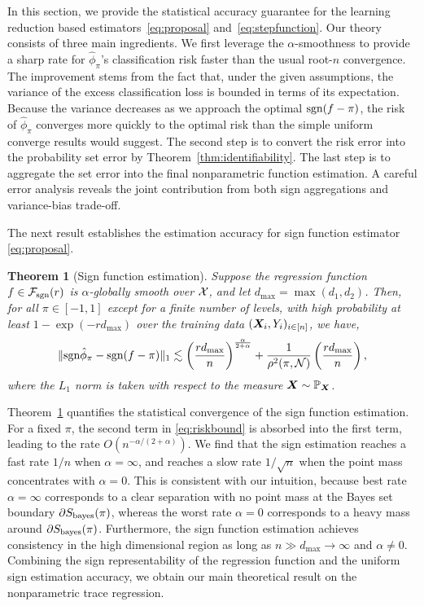 \documentclass[11pt]{article}
\theoremstyle{plain}
\newtheorem{thm}{Theorem}[section]
\theoremstyle{definition}
\def\caliF{\tF_{\textup{sgn}}}
\def\sign{\textup{sgn}}
\def\bayesS{S_{\textup{bayes}}}
\def\caliF{\tF_{\textup{sgn}}}
\begin{document}
In this section, we provide the statistical accuracy guarantee for the learning reduction based estimators~\eqref{eq:proposal} and~\eqref{eq:stepfunction}. Our theory consists of three main ingredients. We first leverage the $\alpha$-smoothness to provide a sharp rate for $\hat \phi_\pi$'s classification risk faster than the usual root-$n$ convergence. The improvement stems from the fact that, under the given assumptions, the variance of the excess classification loss is bounded in terms of its expectation. Because the variance decreases as we approach the optimal $\sign(f-\pi)$, the risk of $\hat \phi_\pi$ converges more quickly to the optimal risk than the simple uniform converge results would suggest.  The second step is to convert the risk error into the probability set error by Theorem~\ref{thm:identifiability}. The last step is to aggregate the set error into the final nonparametric function estimation. A careful error analysis reveals the joint contribution from both sign aggregations and variance-bias trade-off. 

The next result establishes the estimation accuracy for sign function estimator \eqref{eq:proposal}. 

\begin{thm}[Sign function estimation]\label{thm:main} Suppose the regression function $f\in\caliF(r)$ is $\alpha$-globally smooth over $\mathcal{X}$, and let $d_{\max}=\max(d_1,d_2)$. Then, for all $\pi\in[-1,1]$ except for a finite number of levels, with high probability at least $1-\exp(-rd_{\max})$ over the training data $(\bm X_i,Y_i)_{i\in[n]}$, we have, 
\begin{equation}\label{eq:riskbound}
\onenormSize{}{\sign \hat \phi_\pi- \sign(f-\pi)} \lesssim \left({rd_{\max} \over n}\right)^{\alpha\over 2+\alpha}+{1\over \rho^2(\pi, \tN)}\left({rd_{\max}\over n}\right),
\end{equation}
where the $L_1$ norm is taken with respect to the measure $\bm X\sim\mathbb{P}_{\bm X}$. 
\end{thm}

\noindent
Theorem~\ref{thm:main} quantifies the statistical convergence of the sign function estimation. For a fixed $\pi$, the second term in \eqref{eq:riskbound} is absorbed into the first term, leading to the rate $O(n^{-\alpha/(2+\alpha)})$. We find that the sign estimation reaches a fast rate $1/n$ when $\alpha =\infty$, and reaches a slow rate $1/\sqrt{n}$ when the point mass concentrates with $\alpha=0$. This is consistent with our intuition, because best rate $\alpha = \infty$ corresponds to a clear separation with no point mass at the Bayes set boundary $\partial \bayesS(\pi)$, whereas the worst rate $\alpha = 0$ corresponds to a heavy mass around $\partial \bayesS(\pi)$. Furthermore, the sign function estimation achieves consistency in the high dimensional region as long as $n \gg d_{\max}\to \infty$ and $\alpha\neq 0$. Combining the sign representability of the regression function and the uniform sign estimation accuracy, we obtain our main theoretical result on the nonparametric trace regression. 
\end{document}
